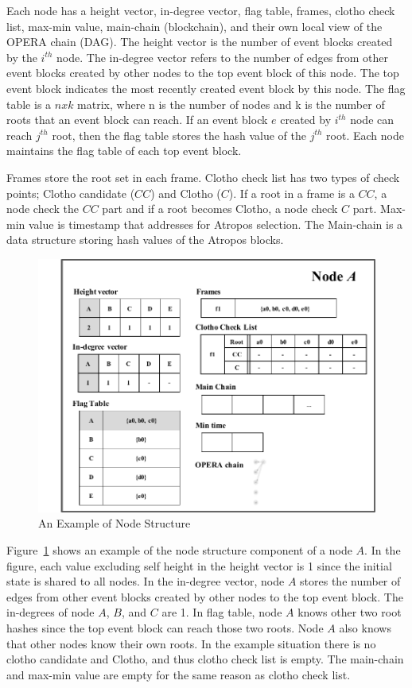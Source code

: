 \documentclass{article}
\begin{document}
Each node has a height vector, in-degree vector, flag table, frames, clotho check list, max-min value, main-chain (blockchain), and their own local view of the OPERA chain (DAG). The height vector is the number of event blocks created by the $i^{th}$ node. The in-degree vector refers to the number of edges from other event blocks created by other nodes to the top event block of this node. The top event block indicates the most recently created event block by this node. The flag table is a $n x k$ matrix, where n is the number of nodes and k is the number of roots that an event block can reach. If an event block $e$ created by $i^{th}$ node can reach $j^{th}$ root, then the flag table stores the hash value of the $j^{th}$ root. Each node maintains the flag table of each top event block. 

Frames store the root set in each frame. Clotho check list has two types of check points; Clotho candidate ($CC$) and Clotho ($C$). If a root in a frame is a $CC$, a node check the $CC$ part and if a root becomes Clotho, a node check $C$ part. Max-min value is timestamp that addresses for Atropos selection. The Main-chain is a data structure storing hash values of the Atropos blocks. 

\begin{figure} \centering  
\includegraphics[width=.5\textwidth]{Node_structure.pdf}
\caption{An Example of Node Structure}
\label{fig:node}
\end{figure}

Figure~\ref{fig:node} shows an example of the node structure component of a node $A$. In the figure, each value excluding self height in the height vector is 1 since the initial state is shared to all nodes. In the in-degree vector, node $A$ stores the number of edges from other event blocks created by other nodes to the top event block. The in-degrees of node $A$, $B$, and $C$ are 1. 
In flag table, node $A$ knows other two root hashes since the top event block can reach those two roots. Node $A$ also knows that other nodes know their own roots. In the example situation there is no clotho candidate and Clotho, and thus clotho check list is empty. The main-chain and max-min value are empty for the same reason as clotho check list. 
\end{document}
